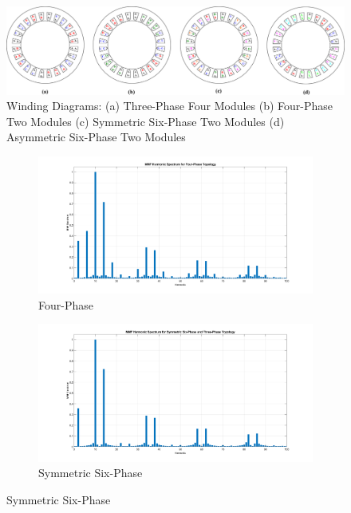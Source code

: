 \documentclass[a4paper,11pt]{article}
\begin{document}
\begin{figure}[ht!]
    \centering
    \includegraphics{windings.png}
    \caption{Winding Diagrams: (a) Three-Phase Four Modules (b) Four-Phase Two Modules (c) Symmetric Six-Phase Two Modules (d) Asymmetric Six-Phase Two Modules  }
    \label{fig:winding}
\end{figure}

\begin{figure}[ht!]
\begin{subfigure}[b]{0.33\textwidth}
    \centering
    \includegraphics[width=\linewidth]{mmf_harm_4ph.png}
    \caption{Four-Phase}
    \label{fig:4phmmf}    
\end{subfigure}
\begin{subfigure}[b]{0.33\textwidth}
    \centering
    \includegraphics[width=\linewidth]{mmf_harm_sym.png}
    \caption{Symmetric Six-Phase}
    \label{fig:s6phmmf}    
\end{subfigure}

\end{figure}
\end{document}
